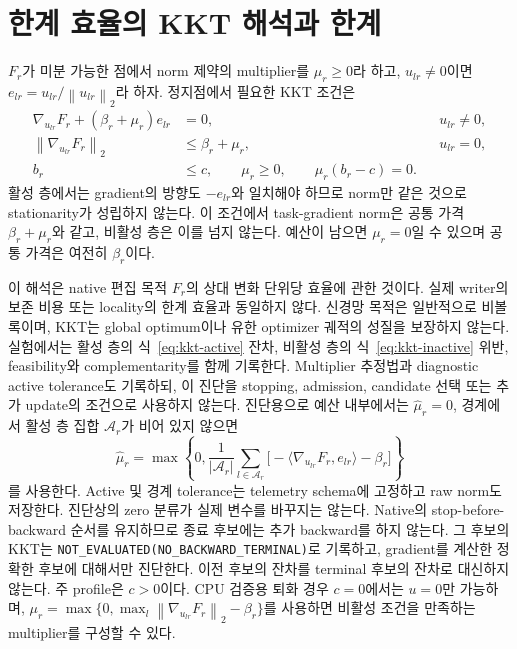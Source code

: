 \documentclass[11pt]{article}
\newcommand{\norm}[1]{\left\lVert #1\right\rVert}
\begin{document}
\section{한계 효율의 KKT 해석과 한계}
$F_r$가 미분 가능한 점에서 norm 제약의 multiplier를 $\mu_r\ge0$라
하고, $u_{lr}\ne0$이면 $e_{lr}=u_{lr}/\norm{u_{lr}}_2$라 하자.
정지점에서 필요한 KKT 조건은
\begin{align}
 \nabla_{u_{lr}}F_r+(\beta_r+\mu_r)e_{lr}&=0,
 &&u_{lr}\ne0,\label{eq:kkt-active}\\
 \norm{\nabla_{u_{lr}}F_r}_2&\le\beta_r+\mu_r,
 &&u_{lr}=0,\label{eq:kkt-inactive}\\
 b_r&\le c,\qquad \mu_r\ge0,\qquad
 \mu_r(b_r-c)=0.
 \label{eq:kkt-feasibility}
\end{align}
활성 층에서는 gradient의 방향도 $-e_{lr}$와 일치해야 하므로 norm만
같은 것으로 stationarity가 성립하지 않는다. 이 조건에서 task-gradient
norm은 공통 가격 $\beta_r+\mu_r$와 같고, 비활성 층은 이를 넘지 않는다.
예산이 남으면 $\mu_r=0$일 수 있으며 공통 가격은 여전히 $\beta_r$이다.

이 해석은 native 편집 목적 $F_r$의 상대 변화 단위당 효율에 관한
것이다. 실제 writer의 보존 비용 또는 locality의 한계 효율과 동일하지
않다. 신경망 목적은 일반적으로 비볼록이며, KKT는 global optimum이나
유한 optimizer 궤적의 성질을 보장하지 않는다.
실험에서는 활성 층의 식~\eqref{eq:kkt-active} 잔차, 비활성 층의
식~\eqref{eq:kkt-inactive} 위반, feasibility와 complementarity를
함께 기록한다. Multiplier 추정법과 diagnostic active tolerance도
기록하되, 이 진단을 stopping, admission, candidate 선택 또는 추가
update의 조건으로 사용하지 않는다.
진단용으로 예산 내부에서는 $\widehat\mu_r=0$, 경계에서 활성 층
집합 $\mathcal A_r$가 비어 있지 않으면
\begin{equation}
 \widehat\mu_r=\max\left\{0,\frac1{|\mathcal A_r|}
 \sum_{l\in\mathcal A_r}\bigl[-\langle\nabla_{u_{lr}}F_r,e_{lr}\rangle
 -\beta_r\bigr]\right\}
 \label{eq:mu-diagnostic}
\end{equation}
를 사용한다. Active 및 경계 tolerance는 telemetry schema에 고정하고
raw norm도 저장한다. 진단상의 zero 분류가 실제 변수를 바꾸지는 않는다.
Native의 stop-before-backward 순서를 유지하므로 종료 후보에는 추가
backward를 하지 않는다. 그 후보의 KKT는
\texttt{NOT\_EVALUATED(NO\_BACKWARD\_TERMINAL)}로 기록하고,
gradient를 계산한 정확한 후보에 대해서만 진단한다. 이전 후보의
잔차를 terminal 후보의 잔차로 대신하지 않는다.
주 profile은 $c>0$이다. CPU 검증용 퇴화 경우 $c=0$에서는 $u=0$만
가능하며, $\mu_r=\max\{0,\max_l\norm{\nabla_{u_{lr}}F_r}_2-\beta_r\}$를
사용하면 비활성 조건을 만족하는 multiplier를 구성할 수 있다.
\end{document}
